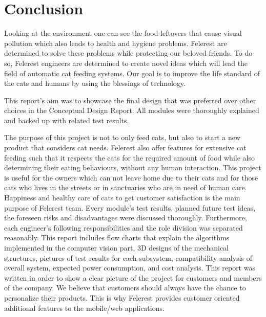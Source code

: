 \section{Conclusion}
\label{sec:conclusion}



Looking at the environment one can see the food leftovers that cause visual pollution which also leads to health and hygiene problems. Felerest are determined to solve these problems while protecting our beloved friends. To do so, Felerest engineers are determined to create novel ideas which will lead the field of automatic cat feeding systems. Our goal is to improve the life standard of the cats and humans by using the blessings of technology. 

This report's aim was to showcase the final design that was preferred over other choices in the Conceptual Design Report. All modules were thoroughly explained and backed up with related test results.

The purpose of this project is not to only feed cats, but also to start a new product that considers cat needs. Felerest also offer features for extensive cat feeding such that it respects the cats for the required amount of food while also determining their eating behaviours, without any human interaction. This project is useful for the owners which can not leave home due to their cats and for those cats who lives in the streets or in sanctuaries who are in need of human care. Happiness and healthy care of cats to get customer satisfaction is the main purpose of Felerest team.
Every module's test results, planned future test ideas, the foreseen risks and disadvantages were discussed thoroughly. Furthermore, each engineer's following responsibilities and the role division was separated reasonably. This report includes flow charts that explain the algorithms implemented in the computer vision part, 3D designs of the mechanical structures, pictures of test results for each subsystem, compatibility analysis of overall system, expected power consumption, and cost analysis. This report was written in order to show a clear picture of the project for customers and members of the company. We believe that customers should always have the chance to personalize their products. This is why Felerest provides customer oriented additional features to the mobile/web applications. 

